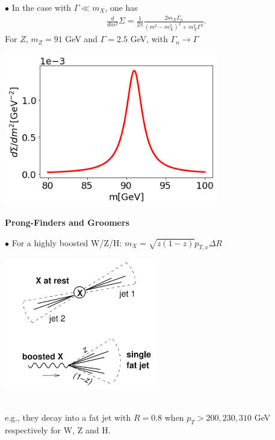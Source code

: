 \documentclass[9pt,a4paper,unknownkeysallowed,xcolor=dvipsnames,aspectratio=43]{beamer}
\begin{document}
%
%
\begin{frame}\vspace{2mm}

{\color{darkred}\Large$\bullet$} In the case with $\Gamma \ll m_X$, one has
\begin{align}
\frac{d}{dm^2}\Sigma = \frac{1}{2\pi}\frac{2m_X \Gamma_n}{(m^2-m_X^2)^2 + m_X^2\Gamma^2}.
\end{align}
\vspace{2mm}
For $Z$, $m_Z=91$ GeV and $
\Gamma=2.5$ GeV, with $\Gamma_n\to \Gamma$
\begin{center}
\includegraphics[width=0.7\textwidth]{05/Zm.png}\end{center}
\end{frame}
%
%
%
\begin{frame}{\bf\huge Prong-Finders and Groomers}

{\color{darkred}\Large$\bullet$} For a highly boosted W/Z/H: $m_X = \sqrt{z(1-z)} p_{T, x} \Delta R$
\vspace{2mm}
\begin{center}
\includegraphics[width=0.5\textwidth]{05/boost.PNG}
\end{center}
\\\vspace{2mm}
e.g., they decay into a fat jet with $R=0.8$ when $p_T>200, 230, 310$ GeV respectively for W, Z and H.
\end{frame}
\end{document}
